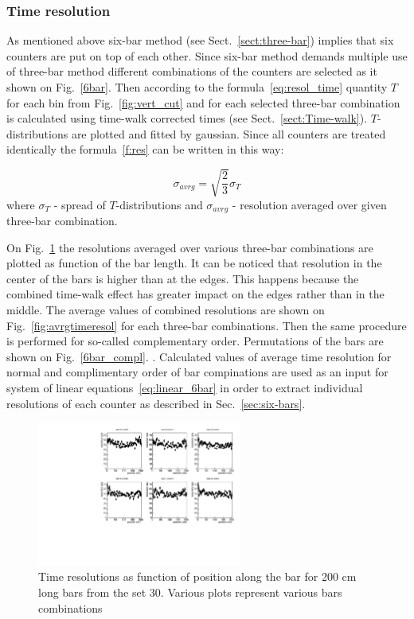 \subsubsection{Time resolution}

As mentioned above six-bar method (see Sect.~\ref{sect:three-bar}) implies that six counters are put on top of each other. Since six-bar method demands multiple use of three-bar method different combinations of the counters are selected  as it shown on Fig.~\ref{6bar}. Then according to the formula~\ref{eq:resol_time} quantity $T$ for each bin from Fig.~\ref{fig:vert_cut} and for each selected three-bar combination is calculated using time-walk corrected times (see Sect.~\ref{sect:Time-walk}). $T$-distributions are plotted and fitted by gaussian. Since all counters are treated identically the formula~\ref{f:res}
can be written in this way:

\begin{equation}
\sigma_{avrg} = \sqrt{\frac{2}{3}}\sigma_T
\end{equation}
where $\sigma_T$ - spread of $T$-distributions and $\sigma_{avrg}$ -  resolution averaged over given three-bar combination.

On Fig.~\ref{fig:timeresol} the resolutions averaged over various three-bar combinations are plotted as function of the bar length. It can be noticed that resolution in the center of the bars is higher than at the edges. This happens because the combined time-walk effect has greater impact on the edges rather than in the middle. The average values of combined resolutions are shown on Fig.~\ref{fig:avrgtimeresol} for each three-bar combinations.
Then the same procedure is performed  for so-called complementary order. Permutations of the bars are shown on Fig.~\ref{6bar_compl}. .
Calculated values of average time resolution for normal and complimentary order of bar compinations are used as an input for system of linear equations~\ref{eq:linear_6bar} in order to extract individual resolutions of each counter as described in Sec.~\ref{sec:six-bars}.


\begin{figure}[]
\centering
\includegraphics[width=0.6\textwidth]{gleb/fig_gleb_time_resol/resolution_203.pdf}
\caption{Time resolutions as function of position along the bar for 200 cm long bars from the set 30. Various plots represent various bars combinations\label{fig:timeresol}}
\end{figure}

